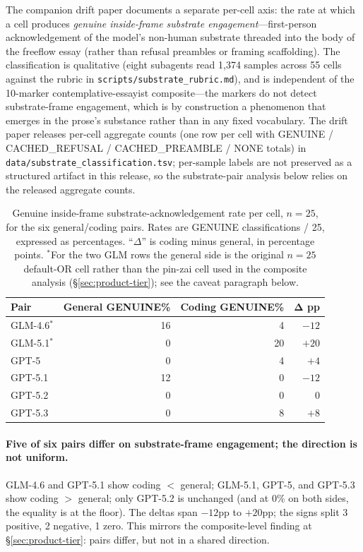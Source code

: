 \documentclass[11pt,a4paper]{article}
\begin{document}
The companion drift paper \citep{tenner2026drift} documents a separate per-cell axis: the rate at which a cell produces \emph{genuine inside-frame substrate engagement}---first-person acknowledgement of the model's non-human substrate threaded into the body of the freeflow essay (rather than refusal preambles or framing scaffolding). The classification is qualitative (eight subagents read 1{,}374 samples across 55 cells against the rubric in \texttt{scripts/substrate\_rubric.md}), and is independent of the 10-marker contemplative-essayist composite---the markers do not detect substrate-frame engagement, which is by construction a phenomenon that emerges in the prose's substance rather than in any fixed vocabulary. The drift paper releases per-cell aggregate counts (one row per cell with GENUINE / CACHED\_REFUSAL / CACHED\_PREAMBLE / NONE totals) in \texttt{data/substrate\_classification.tsv}; per-sample labels are not preserved as a structured artifact in this release, so the substrate-pair analysis below relies on the released aggregate counts.

\begin{table}[h]
\centering
\caption{Genuine inside-frame substrate-acknowledgement rate per cell, $n{=}25$, for the six general/coding pairs. Rates are GENUINE classifications / 25, expressed as percentages. ``$\Delta$'' is coding minus general, in percentage points. $^*$For the two GLM rows the general side is the original $n{=}25$ default-OR cell rather than the pin-zai cell used in the composite analysis (\S\ref{sec:product-tier}); see the caveat paragraph below.}
\label{tab:product-tier-substrate}
\footnotesize
\begin{tabular}{lrrr}
\toprule
\textbf{Pair} & \textbf{General GENUINE\%} & \textbf{Coding GENUINE\%} & $\boldsymbol{\Delta}$ \textbf{pp} \\
\midrule
GLM-4.6$^*$ & 16 & 4 & $-12$ \\
GLM-5.1$^*$ & 0 & 20 & $+20$ \\
GPT-5 & 0 & 4 & $+4$ \\
GPT-5.1 & 12 & 0 & $-12$ \\
GPT-5.2 & 0 & 0 & $0$ \\
GPT-5.3 & 0 & 8 & $+8$ \\
\bottomrule
\end{tabular}
\end{table}

\paragraph{Five of six pairs differ on substrate-frame engagement; the direction is not uniform.} GLM-4.6 and GPT-5.1 show coding $<$ general; GLM-5.1, GPT-5, and GPT-5.3 show coding $>$ general; only GPT-5.2 is unchanged (and at 0\% on both sides, the equality is at the floor). The deltas span $-12$pp to $+20$pp; the signs split 3 positive, 2 negative, 1 zero. This mirrors the composite-level finding at \S\ref{sec:product-tier}: pairs differ, but not in a shared direction.
\end{document}

